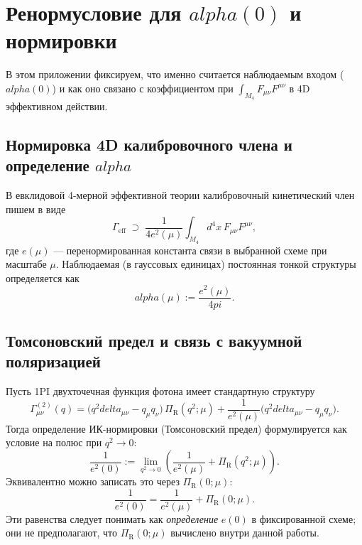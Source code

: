 \documentclass[12pt]{article}
\def\alpha{alpha}%
\def\pi{pi}%
\def\delta{delta}%
\begin{document}
\appendix

\section{Ренормусловие для \texorpdfstring{$\alpha(0)$}{alpha(0)} и нормировки}
В этом приложении фиксируем, что именно считается наблюдаемым входом (\texorpdfstring{$\alpha(0)$}{alpha(0)}) и как оно связано с коэффициентом при $\int_{M_4}F_{\mu\nu}F^{\mu\nu}$ в 4D эффективном действии.

\subsection{Нормировка 4D калибровочного члена и определение \texorpdfstring{$\alpha$}{alpha}}
В евклидовой 4-мерной эффективной теории калибровочный кинетический член пишем в виде
\begin{equation}
\Gamma_{\mathrm{eff}}\;\supset\;\frac{1}{4e^2(\mu)}\int_{M_4} d^4x\, F_{\mu\nu}F^{\mu\nu},
\end{equation}
где $e(\mu)$ --- перенормированная константа связи в выбранной схеме при масштабе $\mu$.
Наблюдаемая (в гауссовых единицах) постоянная тонкой структуры определяется как
\begin{equation}
\alpha(\mu):=\frac{e^2(\mu)}{4\pi}.
\end{equation}

\subsection{Томсоновский предел и связь с вакуумной поляризацией}
Пусть 1PI двухточечная функция фотона имеет стандартную структуру
\begin{equation}
\Gamma^{(2)}_{\mu\nu}(q)
=
\bigl(q^2\delta_{\mu\nu}-q_\mu q_\nu\bigr)\,\Pi_{\mathrm{R}}(q^2;\mu)
+\frac{1}{e^2(\mu)}\bigl(q^2\delta_{\mu\nu}-q_\mu q_\nu\bigr).
\end{equation}
Тогда определение ИК-нормировки (Томсоновский предел) формулируется как условие на полюс при $q^2\to 0$:
\begin{equation}\label{eq:renorm_condition_alpha0}
\frac{1}{e^2(0)}
:=
\lim_{q^2\to 0}
\left(\frac{1}{e^2(\mu)}+\Pi_{\mathrm{R}}(q^2;\mu)\right).
\end{equation}
Эквивалентно можно записать это через $\Pi_{\mathrm{R}}(0;\mu)$:
\begin{equation}\label{eq:e0_from_Pi}
\frac{1}{e^2(0)}
=
\frac{1}{e^2(\mu)}+\Pi_{\mathrm{R}}(0;\mu).
\end{equation}
Эти равенства следует понимать как \emph{определение} $e(0)$ в фиксированной схеме; они не предполагают, что $\Pi_{\mathrm{R}}(0;\mu)$ вычислено внутри данной работы.
\end{document}
